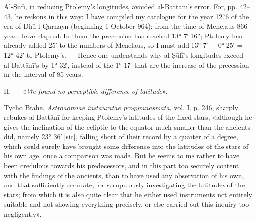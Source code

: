 \documentclass[11pt]{article}
\begin{document}
\addtocounter{footnote}{-1}
\addtocounter{footnoteT}{-1}
\par Al-Ṣūfī, in reducing Ptolemy's longitudes, avoided al-Battānī's error. For, pp. 42–43, he reckons in this way: I have compiled my catalogue for the year 1276 of the era of Dhū l-Qarnayn (beginning 1 October 964); from the time of Menelaus 866 years have elapsed. In them the precession has reached 13° 7′ 16″; Ptolemy has already added 25′ to the numbers of Menelaus, so I must add 13° 7′ − 0° 25′ = 12° 42′ to Ptolemy's. — Hence one understands why al-Ṣūfī's longitudes exceed al-Battānī's by 1° 32′, instead of the 1° 17′ that are the increase of the precession in the interval of 85 years.\par
\par II. — «\emph{We found no perceptible difference of latitude}».\par
\par Tycho Brahe, \emph{Astronomiae instauratae progymnasmata}, vol. I, p. 246, sharply rebukes al-Battānī for keeping Ptolemy's latitudes of the fixed stars, «although he gives the inclination of the ecliptic to the equator much smaller than the ancients did, namely 23° 36′ [sic], falling short of their record by a quarter of a degree, which could surely have brought some difference into the latitudes of the stars of his own age, once a comparison was made. But he seems to me rather to have been credulous towards his predecessors, and in this part too securely content with the findings of the ancients, than to have used any observation of his own, and that sufficiently accurate, for scrupulously investigating the latitudes of the stars; from which it is also quite clear that he either used instruments not entirely suitable and not showing everything precisely, or else carried out this inquiry too negligently».\par
\end{document}

